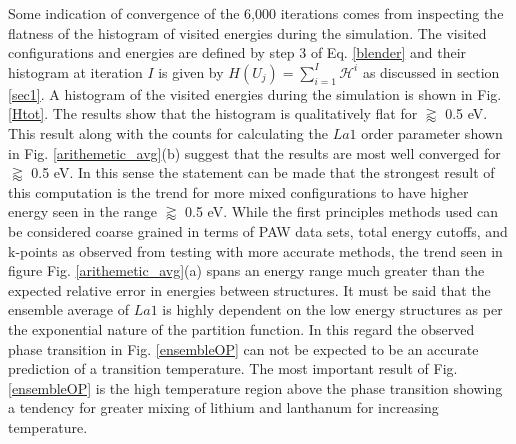 \documentclass[aps,pre,reprint,superscriptaddress,showkeys]{revtex4-1}
\begin{document}
Some indication of convergence of the 6,000 iterations comes from inspecting the flatness of the histogram of visited energies during the simulation. The visited configurations and energies are defined by step 3 of Eq. \ref{blender} and their histogram at iteration $I$ is given by $H(U_j)=\sum_{i=1}^I\mathcal{H}^i$ as discussed in section \ref{sec1}.  A histogram of the visited energies during the simulation is shown in Fig. \ref{Htot}. The results show that  the histogram is qualitatively flat for $\gtrapprox $ 0.5 eV. This result along with the counts for calculating the $La1$ order parameter shown in Fig. \ref{arithemetic_avg}(b) suggest that the results are most well converged for $\gtrapprox $ 0.5 eV. In this sense the statement can be made that the strongest result of this computation is the trend for more mixed configurations to have higher energy seen in the range $\gtrapprox $ 0.5 eV. While the first principles methods used can be considered coarse grained in terms of PAW data sets, total energy cutoffs, and k-points as observed from testing with more accurate methods, the trend seen in figure Fig. \ref{arithemetic_avg}(a) spans an energy range much greater than the expected relative error in energies between structures. It must be said that the ensemble average of $La1$ is highly dependent on the low energy structures as per the exponential nature of the partition function. In this regard the observed phase transition in Fig. \ref{ensembleOP} can not be expected to be an accurate prediction of a transition temperature. The most important result of Fig. \ref{ensembleOP} is the high temperature region above the phase transition showing a tendency for greater mixing of lithium and lanthanum for increasing temperature. 
\end{document}
